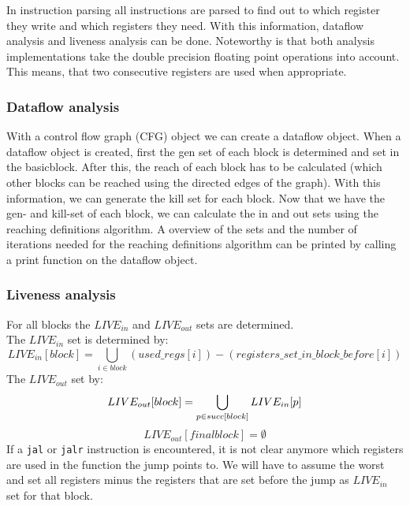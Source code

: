 In instruction parsing all instructions are parsed to find out to which
register they write and which registers they need. With this information,
dataflow analysis and liveness analysis can be done. Noteworthy is that both
analysis implementations take the double precision floating point 
operations into account. This means, that two consecutive registers are used when 
appropriate.
\subsubsection{Dataflow analysis}
With a control flow graph (CFG) object we can create a dataflow object. When a 
dataflow object is created, first the gen set of each block is determined and 
set in the basicblock. After this, the reach of each block has to be calculated
(which other blocks can be reached using the directed edges of the graph). With 
this information, we can generate the kill set for each block.\newline
\newline
Now that we have the gen- and kill-set of each block, we can calculate the
in and out sets using the reaching definitions algorithm.\newline
\newline
A overview of the sets and the number of iterations needed for the reaching 
definitions algorithm can be printed by calling a print function on the dataflow
object.
\subsubsection{Liveness analysis}
For all blocks the $LIVE_{in}$ and $LIVE_{out}$ sets are determined.\\
The $LIVE_{in}$ set is determined by:\\
\begin{equation}
LIVE_{in}[block] = \bigcup_{i \in block}(used\_regs[i]) - (registers\_set\_in\_block\_before[i])
\end{equation}
The $LIVE_{out}$ set by:
\begin{equation}
LIVE_{out}[block] = \bigcup_{p \in succ[block]} LIVE_{in}[p]\\
\end{equation}
\begin{equation}
LIVE_{out}[finalblock] = \emptyset
\end{equation}
If a \texttt{jal} or \texttt{jalr} instruction is encountered, it is not clear 
anymore which registers are used in the function the jump points to. We will 
have to assume the worst and set all registers minus the registers that
are set before the jump as $LIVE_{in}$ set for that block.
